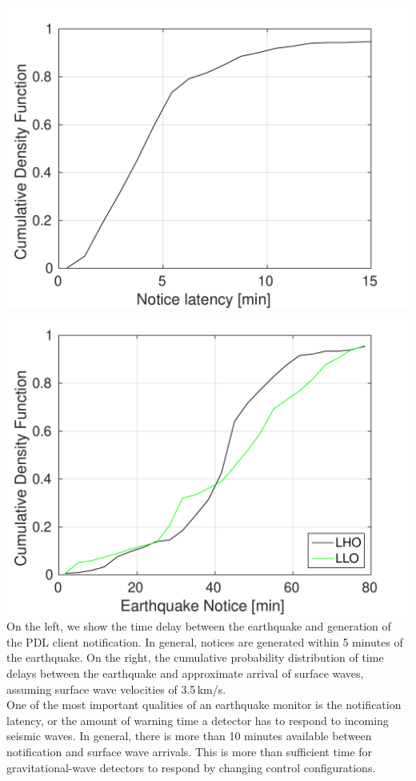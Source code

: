 \documentclass[a0paper,portrait]{baposter}
\begin{document}
\begin{poster}
{ \includegraphics[width=0.49\linewidth]{plots/earthquake_notice.pdf}
 \includegraphics[width=0.49\linewidth]{plots/lockloss_notice.pdf}
 On the left, we show the time delay between the earthquake and generation of the PDL client notification. In general, notices are generated within 5 minutes of the earthquake. On the right,
the cumulative probability distribution of time delays between the earthquake and approximate arrival of surface waves, assuming surface wave velocities of 3.5\,km/s. \\


One of the most important qualities of an earthquake monitor is the notification latency, or the amount of warning time a detector has to respond to incoming seismic waves.
In general, there is more than 10 minutes available between notification and surface wave arrivals.
This is more than sufficient time for gravitational-wave detectors to respond by changing control configurations.

}

\end{poster}
\end{document}
